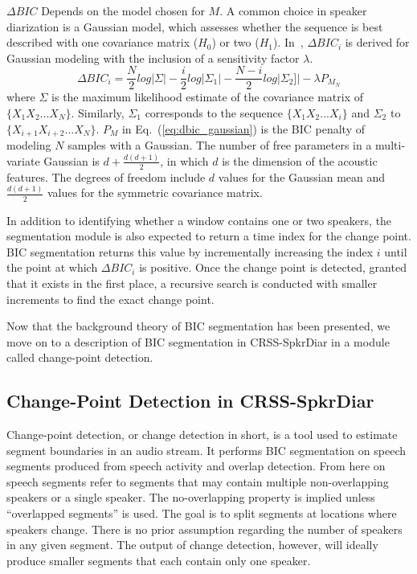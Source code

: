 $\Delta BIC$ Depends on the model chosen for $M$. 
A common choice in speaker diarization is a Gaussian model, which assesses whether the sequence is best described with one covariance matrix ($H_0$) or two ($H_1$). 
In~\cite{cettolo2005evaluation}, $\Delta BIC_i$ is derived for Gaussian modeling with the inclusion of a sensitivity factor $\lambda$. 
\begin{equation}
\label{eq:dbic_gaussian}
\Delta BIC_i = \frac{N}{2} log |\Sigma| - \frac{i}{2} log |\Sigma_1| - \frac{N-i}{2}log |\Sigma_2]| - \lambda P_{M_N}
\end{equation}
where $\Sigma$ is the maximum likelihood estimate of the covariance matrix of $\{X_1X_2...X_N\}$. Similarly, $\Sigma_1$ corresponds to the sequence $\{X_1X_2...X_i\}$ and $\Sigma_2$ to $\{X_{i+1}X_{i+2}...X_N\}$. 
$P_M$ in Eq.~(\ref{eq:dbic_gaussian}) is the BIC penalty of modeling $N$ samples with a Gaussian. 
The number of free parameters in a multi-variate Gaussian is $d + \frac{d(d+1)}{2}$, in which $d$ is the dimension of the acoustic features. 
The degrees of freedom include $d$ values for the Gaussian mean and $\frac{d(d+1)}{2}$ values for the symmetric covariance matrix. 

In addition to identifying whether a window contains one or two speakers, the segmentation module is also expected to return a time index for the change point. 
BIC segmentation returns this value by incrementally increasing the index $i$ until the point at which $\Delta BIC_i$ is positive. 
Once the change point is detected, granted that it exists in the first place, a recursive search is conducted with smaller increments to find the exact change point. 

Now that the background theory of BIC segmentation has been presented, we move on to a description of BIC segmentation in CRSS-SpkrDiar in a module called change-point detection. 

\subsection{Change-Point Detection in CRSS-SpkrDiar}
Change-point detection, or change detection in short, is a tool used to estimate segment boundaries in an audio stream. 
It performs BIC segmentation on speech segments produced from speech activity and overlap detection. 
From here on speech segments refer to segments that may contain multiple non-overlapping speakers or a single speaker. 
The no-overlapping property is implied unless ``overlapped segments'' is used. 
The goal is to split segments at locations where speakers change. 
There is no prior assumption regarding the number of speakers in any given segment. 
The output of change detection, however, will ideally produce smaller segments that each contain only one speaker. 


